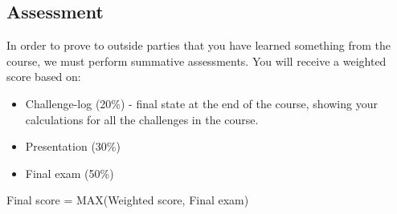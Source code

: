 \subsection{Assessment}
In order to prove to outside parties that you have learned something from the course, we must perform summative assessments. You will receive a weighted score based on:

\begin{itemize}
    \item Challenge-log (20\%) - final state at the end of the course, showing your calculations for all the challenges in the course.
    \item Presentation (30\%)
    \item Final exam (50\%)
\end{itemize}

Final score = MAX(Weighted score, Final exam)
